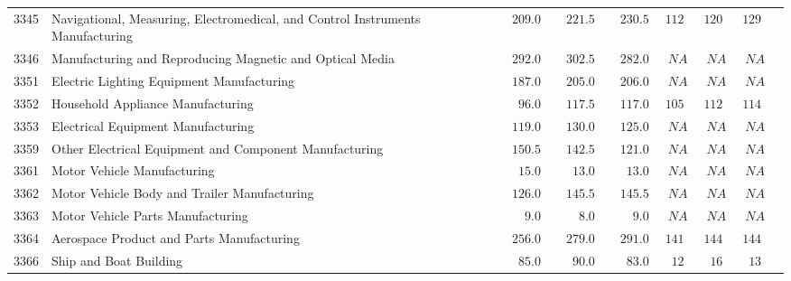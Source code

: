 \documentclass[9pt, oneside]{article}   	%
\begin{document}
\begin{longtable}{lp{3.5 in}ccccccc}
3345  & Navigational, Measuring, Electromedical, and Control Instruments Manufacturing & $\phantom{00}209.0$ & $\phantom{00}221.5$ & $\phantom{00}230.5$ & $112$ & $120$ & $129$ \\
3346  & Manufacturing and Reproducing Magnetic and Optical Media & $\phantom{00}292.0$ & $\phantom{00}302.5$ & $\phantom{00}282.0$ & $\phantom{0}NA$ & $\phantom{0}NA$ & $\phantom{0}NA$ \\
3351  & Electric Lighting Equipment Manufacturing & $\phantom{00}187.0$ & $\phantom{00}205.0$ & $\phantom{00}206.0$ & $\phantom{0}NA$ & $\phantom{0}NA$ & $\phantom{0}NA$ \\
3352  & Household Appliance Manufacturing & $\phantom{000}96.0$ & $\phantom{00}117.5$ & $\phantom{00}117.0$ & $105$ & $112$ & $114$ \\
3353  & Electrical Equipment Manufacturing & $\phantom{00}119.0$ & $\phantom{00}130.0$ & $\phantom{00}125.0$ & $\phantom{0}NA$ & $\phantom{0}NA$ & $\phantom{0}NA$ \\
3359  & Other Electrical Equipment and Component Manufacturing & $\phantom{00}150.5$ & $\phantom{00}142.5$ & $\phantom{00}121.0$ & $\phantom{0}NA$ & $\phantom{0}NA$ & $\phantom{0}NA$ \\
3361  & Motor Vehicle Manufacturing & $\phantom{000}15.0$ & $\phantom{000}13.0$ & $\phantom{000}13.0$ & $\phantom{0}NA$ & $\phantom{0}NA$ & $\phantom{0}NA$ \\
3362  & Motor Vehicle Body and Trailer Manufacturing & $\phantom{00}126.0$ & $\phantom{00}145.5$ & $\phantom{00}145.5$ & $\phantom{0}NA$ & $\phantom{0}NA$ & $\phantom{0}NA$ \\
3363  & Motor Vehicle Parts Manufacturing & $\phantom{0000}9.0$ & $\phantom{0000}8.0$ & $\phantom{0000}9.0$ & $\phantom{0}NA$ & $\phantom{0}NA$ & $\phantom{0}NA$ \\
3364  & Aerospace Product and Parts Manufacturing & $\phantom{00}256.0$ & $\phantom{00}279.0$ & $\phantom{00}291.0$ & $141$ & $144$ & $144$ \\
3366  & Ship and Boat Building & $\phantom{000}85.0$ & $\phantom{000}90.0$ & $\phantom{000}83.0$ & $\phantom{0}12$ & $\phantom{0}16$ & $\phantom{0}13$ \\

\end{longtable}
\end{document}
